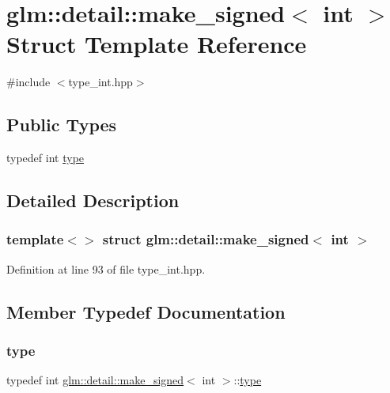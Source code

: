 \hypertarget{structglm_1_1detail_1_1make__signed_3_01int_01_4}{}\section{glm\+::detail\+::make\+\_\+signed$<$ int $>$ Struct Template Reference}
\label{structglm_1_1detail_1_1make__signed_3_01int_01_4}


{\ttfamily \#include $<$type\+\_\+int.\+hpp$>$}

\subsection*{Public Types}
\begin{DoxyCompactItemize}
\item 
typedef int \mbox{\hyperlink{structglm_1_1detail_1_1make__signed_3_01int_01_4_a69085e97a5044d1985cdc2116eb6ea9b}{type}}
\end{DoxyCompactItemize}


\subsection{Detailed Description}
\subsubsection*{template$<$$>$\newline
struct glm\+::detail\+::make\+\_\+signed$<$ int $>$}



Definition at line 93 of file type\+\_\+int.\+hpp.



\subsection{Member Typedef Documentation}
\mbox{\label{structglm_1_1detail_1_1make__signed_3_01int_01_4_a69085e97a5044d1985cdc2116eb6ea9b}} 
\subsubsection{\texorpdfstring{type}{type}}
{\footnotesize\ttfamily typedef int \mbox{\hyperlink{structglm_1_1detail_1_1make__signed}{glm\+::detail\+::make\+\_\+signed}}$<$ int $>$\+::\mbox{\hyperlink{structglm_1_1detail_1_1make__signed_3_01int_01_4_a69085e97a5044d1985cdc2116eb6ea9b}{type}}}



